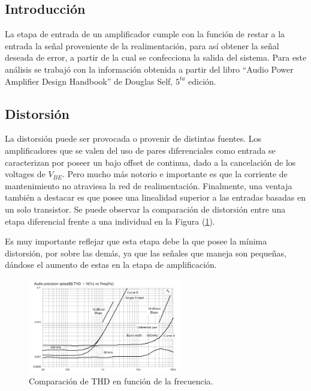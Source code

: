 \subsection{Introducción}

La etapa de entrada de un amplificador cumple con la función de restar a la entrada la señal proveniente de la realimentación, para así obtener la señal deseada de error, a partir de la cual se confecciona la salida del sistema. Para este análisis se trabajó con la información obtenida a partir del libro ``Audio Power Amplifier Design Handbook'' de Douglas Self, $5^{ta}$ edición.

\subsection{Distorsión}

La distorsión puede ser provocada o provenir de distintas fuentes. Los amplificadores que se valen del uso de pares diferenciales como entrada se caracterizan por poseer un bajo offset de continua, dado a la cancelación de los voltages de $V_{BE}$. Pero mucho más notorio e importante es que la corriente de mantenimiento no atraviesa la red de realimentación. Finalmente, una ventaja también a destacar es que posee una linealidad superior a las entradas basadas en un solo transistor. Se puede observar la comparación de distorsión entre una etapa diferencial frente a una individual en la Figura (\ref{fig:thd1}).

Es muy importante reflejar que esta etapa debe la que posee la mínima distorsión, por sobre las demás, ya que las señales que maneja son pequeñas, dándose el aumento de estas en la etapa de amplificación.    
\begin{figure}[H]
\centering
	\includegraphics[width=0.6\textwidth]{ImagenesInput-Stage/thd1.PNG}
	\caption{Comparación de THD en función de la frecuencia.}
	\label{fig:thd1}
\end{figure}

